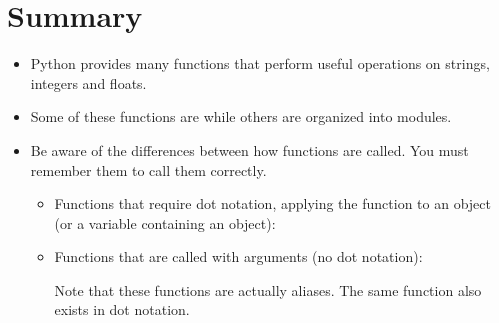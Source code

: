 \documentclass[letterpaper,10pt,english]{sphinxmanual}
\begin{document}
\section{Summary}
\label{\detokenize{lecture_notes/lec04_modules_functions1:summary}}\begin{itemize}
\item {} 
Python provides many functions that perform useful operations on
strings, integers and floats.

\item {} 
Some of these functions are  while others are organized
into modules.

\item {} 
Be aware of the differences between how functions are called. You
must remember them to call them correctly.
\begin{itemize}
\item {} 
Functions that require dot notation, applying the function
to an object (or a variable containing an object):

%
\begin{sphinxVerbatim}[commandchars=\\\{\}]
\end{sphinxVerbatim}

\item {} 
Functions that are called with arguments (no dot notation):

%
\begin{sphinxVerbatim}[commandchars=\\\{\}]
  
\end{sphinxVerbatim}

Note that these functions are actually aliases. The same function
also exists in dot notation.


\end{itemize}
\end{itemize}
\end{document}
